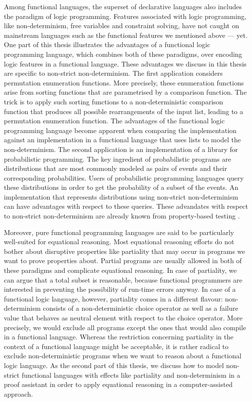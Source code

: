 Among functional languages, the superset of declarative languages also includes the paradigm of logic programming.
Features associated with logic programming, like non\--determinism, free variables and constraint solving, have not caught on mainstream languages such as the functional features we mentioned above --- yet.
One part of this thesis illustrates the advantages of a functional logic programming language, which combines both of these paradigms, over encoding logic features in a functional language.
These advantages we discuss in this thesis are specific to non\--strict non\--determinism.
The first application considers permutation enumeration functions.
More precisely, these enumeration functions arise from sorting functions that are parametrised by a comparison function.
The trick is to apply such sorting functions to a non\--deterministic comparison function that produces all possible rearrangements of the input list, leading to a permutation enumeration function.
The advantages of the functional logic programming language become apparent when comparing the implementation against an implementation in a functional language that uses lists to model the non\--determinism.
The second application is an implementation of a library for probabilistic programming.
The key ingredient of probabilistic programs are distributions that are most commonly modeled as pairs of events and their corresponding probabilities.
Users of probabilistic programming languages query these distributions in order to get the probability of a subset of the events.
An implementation that represents distributions using non\--strict non\--determinism can have advantages with respect to these queries.
These advandates with respect to non-strict non-determinism are already known from property\--based testing \citep{christiansen2008easycheck,runciman2008smallcheck}.

Moreover, pure functional programming languages are said to be particularly well\--suited for equational reasoning.
Most equational reasoning efforts do not bother about disruptive properties like partiality that may occur in programs we want to prove properties about.
Partial programs are usually allowed in both of these paradigms and complicate equational reasoning.
In case of partiality, we can argue that a total subset is reasonable, because functional programmers are interested in preventing the possibility of run\--time errors anyway.
In case of a functional logic language, however, partiality comes in a different flavour: non\--determinism consists of a non\--deterministic choice operator as well as a failure value that behaves as neutral element with respect to the choice operator.
More precisely, we would exclude all programs except the ones that would also compile in a functional language.
Whereas the restriction concerning partiality in the context of a functional language might be acceptable, it is rather radical to exclude non\--deterministic programs when we want to reason about a functional logic language.
As the second part of this thesis, we discuss how to model non\--strict functional languages with effects like partiality and non\--determinism in a proof assistant in order to apply equational reasoning in a computer\--assisted approach.

